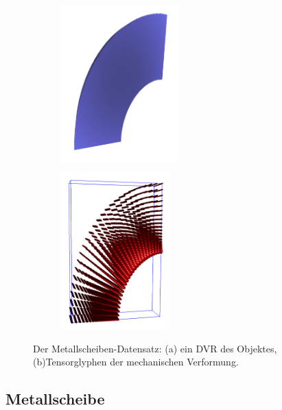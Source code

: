 \documentclass[a4paper,fontsize=12pt,toc=bib,halfparskip]{scrartcl}
\begin{document}
\begin{figure}
	\hspace*{\fill}
	\begin{subfigure}{0.25\textwidth}
		\centering
		\includegraphics[height=6cm]{pictures/results/MetalDisk/MetalDisk_Object.png}
		\subcaption{}
		\label{MetalDiskObject}
	\end{subfigure}
	\hspace{2cm}
	\begin{subfigure}{0.25\textwidth}
		\centering
		\includegraphics[height=6cm]{pictures/results/MetalDisk/strain/MetalDisk_Strain_Ellipsoids.png}
		\subcaption{}
		\label{MetalDiskStrainEllipsoids}
	\end{subfigure}
	\hspace*{\fill}
	\caption{Der Metallscheiben-Datensatz: (a) ein DVR des Objektes, (b)Tensorglyphen der mechanischen Verformung.}
	\label{MetalDisk}
\end{figure}

\subsection{Metallscheibe}
\end{document}
